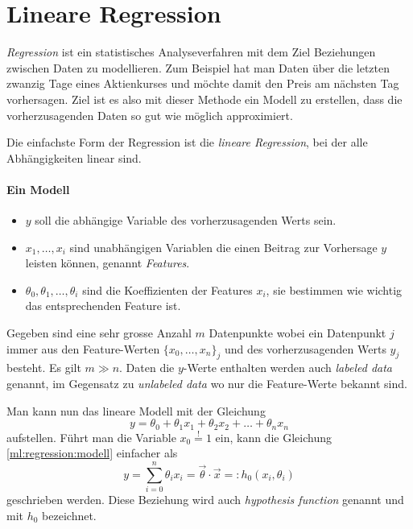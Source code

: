 %
%
%
%

\section{Lineare Regression\label{chapter:ml:regression}}

\emph{Regression} ist ein statistisches Analyseverfahren mit dem Ziel Beziehungen zwischen
Daten zu modellieren. Zum Beispiel hat man Daten über die letzten zwanzig Tage eines
Aktienkurses und möchte damit den Preis am nächsten Tag vorhersagen. Ziel ist es also mit
dieser Methode ein Modell zu erstellen, dass die vorherzusagenden Daten so gut wie möglich
approximiert.

Die einfachste Form der Regression ist die \emph{lineare Regression}, bei der alle Abhängigkeiten linear
sind.

\paragraph{Ein Modell}
\begin{itemize}
    \item $y$ soll die abhängige Variable des vorherzusagenden Werts sein.
    \item $x_1, \dots, x_i$ sind unabhängigen Variablen die einen Beitrag zur Vorhersage
    $y$ leisten können, genannt \emph{Features}.
    \item $\theta_0, \theta_1, \dots, \theta_i$ sind die Koeffizienten der Features $x_i$,
    sie bestimmen wie wichtig das entsprechenden Feature ist.
\end{itemize}

Gegeben sind eine sehr grosse Anzahl $m$ Datenpunkte wobei ein Datenpunkt $j$ immer aus
den Feature-Werten $\{ x_0, \dots, x_n \}_j$ und des vorherzusagenden Werts $y_j$ besteht.
Es gilt $m \gg n$. Daten die $y$-Werte enthalten werden auch \emph{labeled data} genannt,
im Gegensatz zu \emph{unlabeled data} wo nur die Feature-Werte bekannt sind.

Man kann nun das lineare Modell mit der Gleichung
\begin{equation}
y = \theta_0 + \theta_1 x_1 + \theta_2 x_2 + \dots + \theta_n x_n
\label{ml:regression:modell}
\end{equation}
aufstellen. Führt man die Variable $x_0 \overset{!}{=} 1$ ein, kann die Gleichung
\ref{ml:regression:modell} einfacher als
\begin{equation}
y = \sum_{i = 0}^{n} \theta_i x_i = \vec \theta \cdot \vec x =: h_0(x_i, \theta_i)
\label{ml:regression:hypothesis}
\end{equation}
geschrieben werden. Diese Beziehung wird auch \emph{hypothesis function} genannt und mit
$h_0$ bezeichnet.

